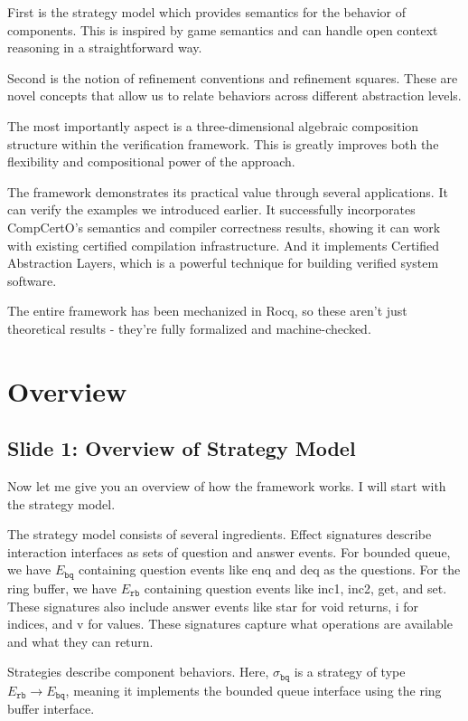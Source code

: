 \documentclass{article}
\newcommand{\kw}[1]{\ensuremath{\mathtt{#1}}}
\begin{document}
First is the strategy model which provides semantics for the behavior of
components. This is inspired by game semantics and can handle open context
reasoning in a straightforward way.

Second is the notion of refinement conventions and refinement squares. These are
novel concepts that allow us to relate behaviors across different abstraction
levels.

The most importantly aspect is a three-dimensional algebraic composition
structure within the verification framework. This is greatly improves both the
flexibility and compositional power of the approach.

The framework demonstrates its practical value through several applications. It
can verify the examples we introduced earlier. It successfully incorporates
CompCertO's semantics and compiler correctness results, showing it can work with
existing certified compilation infrastructure. And it implements Certified
Abstraction Layers, which is a powerful technique for building verified system
software.

The entire framework has been mechanized in Rocq, so these aren't just
theoretical results - they're fully formalized and machine-checked.

\section{Overview}

\subsection{Slide 1: Overview of Strategy Model}

Now let me give you an overview of how the framework works.
I will start with the strategy model.

The strategy model consists of several ingredients. Effect signatures describe
interaction interfaces as sets of question and answer events. For bounded queue,
we have $E_\kw{bq}$ containing question events like enq and deq as the
questions. For the ring buffer, we have $E_\kw{rb}$ containing question events
like inc1, inc2, get, and set. These signatures also include answer events like
star for void returns, i for indices, and v for values. These signatures capture
what operations are available and what they can return.

Strategies describe component behaviors. Here, $\sigma_\kw{bq}$ is a strategy of
type $E_\kw{rb} \rightarrow E_\kw{bq}$, meaning it implements the bounded queue
interface using the ring buffer interface.
\end{document}
